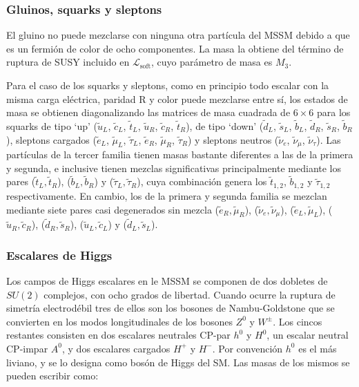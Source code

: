 \subsubsection{Gluinos, squarks y sleptons}

El gluino no puede mezclarse con ninguna otra partícula del MSSM debido a
que es un fermión de color de ocho componentes. La masa la obtiene del término de ruptura de SUSY incluido en $\mathcal{L}_{\text{soft}}$, cuyo parámetro de masa es $M_3$.

Para el caso de los squarks y sleptons, como en principio todo escalar con la misma carga eléctrica, paridad R y color puede mezclarse entre sí, los estados de masa se obtienen diagonalizando las matrices de masa cuadrada de $6\times6$ para los squarks de tipo `up' ($\tilde{u}_L$, $\tilde{c}_L$, $\tilde{t}_L$, $\tilde{u}_R$, $\tilde{c}_R$, $\tilde{t}_R$), de tipo `down' ($\tilde{d}_L$, $\tilde{s}_L$, $\tilde{b}_L$, $\tilde{d}_R$, $\tilde{s}_R$, $\tilde{b}_R$), sleptons cargados ($\tilde{e}_L$, $\tilde{\mu}_L$, $\tilde{\tau}_L$, $\tilde{e}_R$, $\tilde{\mu}_R$, $\tilde{\tau}_R$) y sleptons neutros ($\tilde{\nu}_e$, $\tilde{\nu}_{\mu}$, $\tilde{\nu}_{\tau}$). Las partículas de la tercer familia tienen masas bastante diferentes a las de la primera y segunda, e inclusive tienen mezclas significativas principalmente mediante los pares ($\tilde{t}_L, \tilde{t}_R$), ($\tilde{b}_L, \tilde{b}_R$) y ($\tilde{\tau}_L, \tilde{\tau}_R$), cuya combinación genera los $\tilde{t}_{1,2}$, $\tilde{b}_{1,2}$ y $\tilde{\tau}_{1,2}$ respectivamente. En cambio, los de la primera y segunda familia se mezclan mediante siete pares casi degenerados sin mezcla ($\tilde{e}_R, \tilde{\mu}_R$), ($\tilde{\nu}_e, \tilde{\nu}_\mu$), ($\tilde{e}_L, \tilde{\mu}_L$), ($\tilde{u}_R, \tilde{c}_R$), ($\tilde{d}_R, \tilde{s}_R$), ($\tilde{u}_L, \tilde{c}_L$) y ($\tilde{d}_L, \tilde{s}_L$).





\subsubsection{Escalares de Higgs}

Los campos de Higgs escalares en le MSSM se componen de dos dobletes de $SU(2)$ complejos, con ocho grados de libertad. Cuando ocurre la ruptura de simetría electrodébil tres de ellos son los bosones de Nambu-Goldstone que se convierten en los modos longitudinales de los bosones $Z^0$ y $W^{\pm}$. Los cincos restantes consisten en dos escalares neutrales CP-par $h^0$ y $H^0$, un escalar neutral CP-impar $A^0$, y dos escalares cargados $H^+$ y $H^-$. Por convención $h^0$ es el más liviano, y se lo designa como bosón de Higgs del SM. Las masas de los mismos se pueden escribir como:

